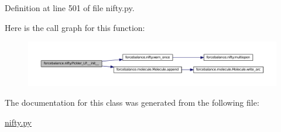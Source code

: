 \-Definition at line 501 of file nifty.\-py.



\-Here is the call graph for this function\-:
\nopagebreak
\begin{figure}[H]
\begin{center}
\leavevmode
\includegraphics[width=350pt]{classforcebalance_1_1nifty_1_1Pickler__LP_af59a709f44c96a91c753ce02cff07ae8_cgraph}
\end{center}
\end{figure}




\-The documentation for this class was generated from the following file\-:\begin{DoxyCompactItemize}
\item 
\hyperlink{nifty_8py}{nifty.\-py}\end{DoxyCompactItemize}
